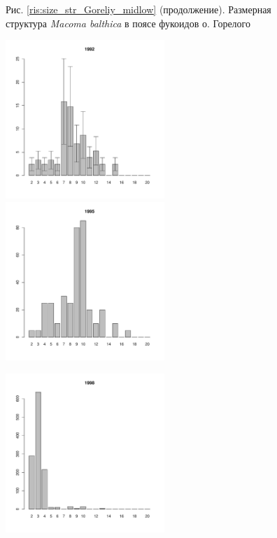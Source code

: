 \documentclass[12pt, a4paper]{article}
\begin{document}
\begin{figure}[h]


\begin{center}
Рис. \ref{ris:size_str_Goreliy_midlow} (продолжение). Размерная структура {\it Macoma balthica} в поясе фукоидов о. Горелого

\end{center}
\end{figure}





\newpage \begin{figure}[h] 

\begin{multicols}{3}
\hfill
\includegraphics[width=60mm]{../White_Sea/Luvenga_Goreliy/low2_1992_.pdf}
\hfill
\includegraphics[width=60mm]{../White_Sea/Luvenga_Goreliy/low2_1995_.pdf}

\hfill
\includegraphics[width=60mm]{../White_Sea/Luvenga_Goreliy/low2_1998_.pdf}


\end{multicols}
\end{figure}
\end{document}
